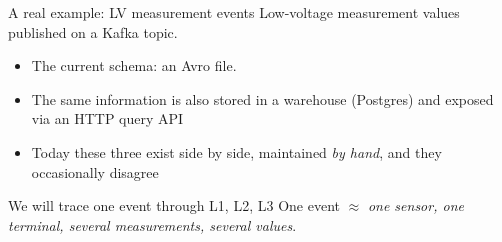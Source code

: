 \begin{frame}{A real example: LV measurement events}
	Low-voltage measurement values published on a Kafka topic.
	\vspace{0.4em}
	\begin{itemize}
		\item The current schema: an Avro file. 
		\item The same information is also stored in a warehouse (Postgres) and exposed via an HTTP query API
		\item Today these three exist side by side, maintained \emph{by hand}, and they occasionally disagree
	\end{itemize}
	\begin{block}{We will trace one event through L1, L2, L3}
	One event $\approx$ \emph{one sensor, one terminal, several measurements, several values}.
	\end{block}
\end{frame}
